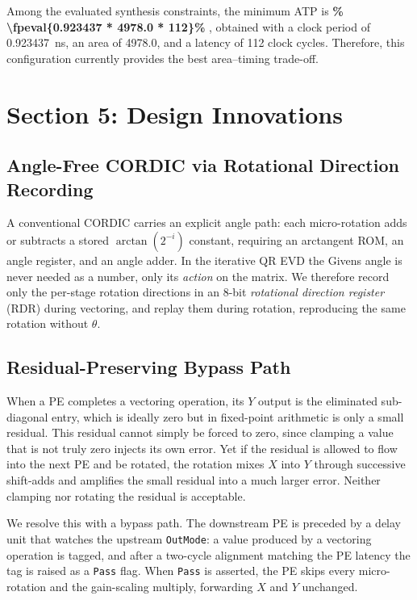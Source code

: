 \documentclass[12pt,a4paper]{report}
\newcommand{\LatencyCycles}{112}
\newcommand{\BestClockPeriod}{0.923437}
\newcommand{\BestArea}{4978.0}
\newcommand{\ATPValue}[2]{%
    \fpeval{#1 * #2 * \LatencyCycles}%
}
\begin{document}
Among the evaluated synthesis constraints, the minimum ATP is
\textbf{\num[mode=text,detect-weight=true,group-separator={,},
round-mode=places,round-precision=1]
{\ATPValue{\BestClockPeriod}{\BestArea}}}, obtained with a clock period of
\SI{\BestClockPeriod}{ns}, an area of
\num[group-separator={,},group-minimum-digits=4]{\BestArea}, and a latency of
\LatencyCycles{} clock cycles. Therefore, this configuration currently
provides the best area--timing trade-off.

\newpage


\chapter{Section 5: Design Innovations}

\section{Angle-Free CORDIC via Rotational Direction Recording}

A conventional CORDIC carries an explicit angle path: each micro-rotation adds or
subtracts a stored $\arctan(2^{-i})$ constant, requiring an arctangent ROM, an angle
register, and an angle adder. In the iterative QR EVD the Givens angle is never needed
as a number, only its \emph{action} on the matrix. We therefore record only the
per-stage rotation directions in an $8$-bit \emph{rotational direction register}
(RDR) during vectoring, and replay them during rotation, reproducing the same rotation
without $\theta$.

\section{Residual-Preserving Bypass Path}

When a PE completes a vectoring operation, its $Y$ output is the eliminated
sub-diagonal entry, which is ideally zero but in fixed-point arithmetic is only a
small residual. This residual cannot simply be forced to zero, since clamping a value
that is not truly zero injects its own error. Yet if the residual is allowed to flow
into the next PE and be rotated, the rotation mixes $X$ into $Y$ through successive
shift-adds and amplifies the small residual into a much larger error. Neither
clamping nor rotating the residual is acceptable.

We resolve this with a bypass path. The downstream PE is preceded by a delay unit
that watches the upstream \texttt{OutMode}: a value produced by a vectoring operation
is tagged, and after a two-cycle alignment matching the PE latency the tag is raised
as a \texttt{Pass} flag. When \texttt{Pass} is asserted, the PE skips every
micro-rotation and the gain-scaling multiply, forwarding $X$ and $Y$ unchanged.
\end{document}
